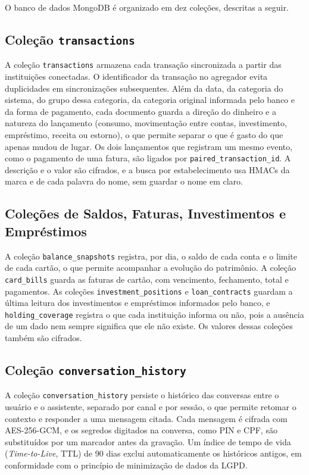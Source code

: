 O banco de dados MongoDB é organizado em dez coleções, descritas a seguir.

\subsection{Coleção \texttt{transactions}}

A coleção \texttt{transactions} armazena cada transação sincronizada a partir das instituições conectadas. O identificador da transação no agregador evita duplicidades em sincronizações subsequentes. Além da data, da categoria do sistema, do grupo dessa categoria, da categoria original informada pelo banco e da forma de pagamento, cada documento guarda a direção do dinheiro e a natureza do lançamento (consumo, movimentação entre contas, investimento, empréstimo, receita ou estorno), o que permite separar o que é gasto do que apenas mudou de lugar. Os dois lançamentos que registram um mesmo evento, como o pagamento de uma fatura, são ligados por \texttt{paired\_transaction\_id}. A descrição e o valor são cifrados, e a busca por estabelecimento usa HMACs da marca e de cada palavra do nome, sem guardar o nome em claro.

\subsection{Coleções de Saldos, Faturas, Investimentos e Empréstimos}

A coleção \texttt{balance\_snapshots} registra, por dia, o saldo de cada conta e o limite de cada cartão, o que permite acompanhar a evolução do patrimônio. A coleção \texttt{card\_bills} guarda as faturas de cartão, com vencimento, fechamento, total e pagamentos. As coleções \texttt{investment\_positions} e \texttt{loan\_contracts} guardam a última leitura dos investimentos e empréstimos informados pelo banco, e \texttt{holding\_coverage} registra o que cada instituição informa ou não, pois a ausência de um dado nem sempre significa que ele não existe. Os valores dessas coleções também são cifrados.

\subsection{Coleção \texttt{conversation\_history}}

A coleção \texttt{conversation\_history} persiste o histórico das conversas entre o usuário e o assistente, separado por canal e por sessão, o que permite retomar o contexto e responder a uma mensagem citada. Cada mensagem é cifrada com AES-256-GCM, e os segredos digitados na conversa, como PIN e CPF, são substituídos por um marcador antes da gravação. Um índice de tempo de vida (\textit{Time-to-Live}, TTL) de 90 dias exclui automaticamente os históricos antigos, em conformidade com o princípio de minimização de dados da LGPD.

